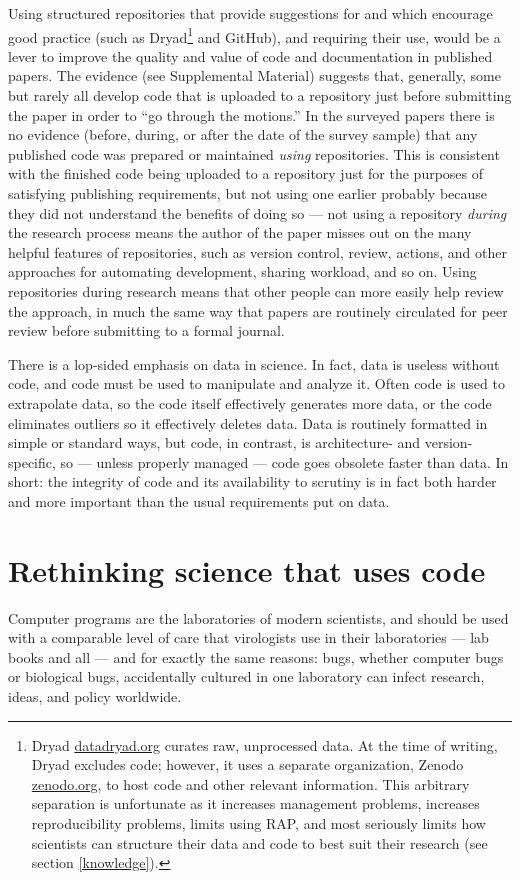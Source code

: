 \documentclass{comjnl}
\def\supplement{Supplemental Material}
\begin{document}
Using structured repositories that provide suggestions for and which encourage good practice (such as Dryad\footnote{Dryad \url{datadryad.org} curates raw, unprocessed data. At the time of writing, Dryad excludes code; however, it uses a separate organization, Zenodo \url{zenodo.org}, to host code and other relevant information. This arbitrary separation is unfortunate as it increases management problems, increases reproducibility problems, limits using RAP, and most seriously limits how scientists can structure their data and code to best suit their research (see section \ref{knowledge}).} and GitHub), and requiring their use, would be a lever to improve the quality and value of code and documentation in published papers. The evidence (see \supplement) suggests that, generally, some but rarely all develop code that is uploaded to a repository just before submitting the paper in order to ``go through the motions.'' In the surveyed papers there is no evidence (before, during, or after the date of the survey sample) that any published code was prepared or maintained \emph{using\/} repositories. This is consistent with the finished code being uploaded to a repository just for the purposes of satisfying publishing requirements, but not using one earlier probably because they did not understand the benefits of doing so --- not using a repository \emph{during\/} the research process means the author of the paper misses out on the many helpful features of repositories, such as version control, review, actions, and other approaches for automating development, sharing workload, and so on. Using repositories during research means that other people can more easily help review the approach, in much the same way that papers are routinely circulated for peer review before submitting to a formal journal.

There is a lop-sided emphasis on data in science. In fact, data is useless without code, and code must be used to manipulate and analyze it. Often code is used to extrapolate data, so the code itself effectively generates more data, or the code eliminates outliers so it effectively deletes data. Data is routinely formatted in simple or standard ways, but code, in contrast, is architecture- and version-specific, so --- unless properly managed --- code goes obsolete faster than data. In short: the integrity of code and its availability to scrutiny is in fact both harder and more important than the usual requirements put on data.

\section{Rethinking science that uses code}\label{summary}
Computer programs are the laboratories of modern scientists, and should be used with a comparable level of care that virologists use in their laboratories --- lab books and all \cite{notebooks} --- and for exactly the same reasons: bugs, whether computer bugs or biological bugs, accidentally cultured in one laboratory can infect research, ideas, and policy worldwide. 
\end{document}
